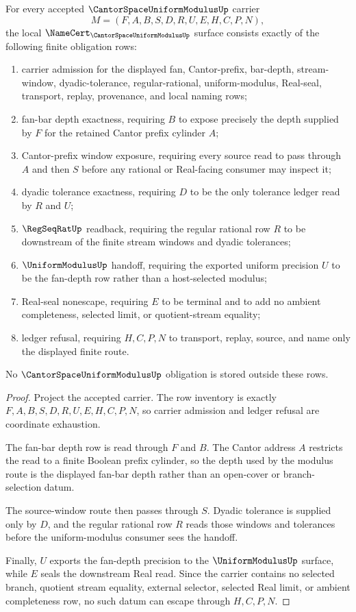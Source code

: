 \begin{theorem}
\label{thm:cantor-space-uniform-modulus-namecert-obligations}
For every accepted $\CantorSpaceUniformModulusUp$ carrier
$$
M=(F,A,B,S,D,R,U,E,H,C,P,N),
$$
the local $\NameCert_{\CantorSpaceUniformModulusUp}$ surface consists exactly of the following finite obligation rows:
\begin{enumerate}
\item carrier admission for the displayed fan, Cantor-prefix, bar-depth, stream-window, dyadic-tolerance, regular-rational, uniform-modulus, Real-seal, transport, replay, provenance, and local naming rows;
\item fan-bar depth exactness, requiring $B$ to expose precisely the depth supplied by $F$ for the retained Cantor prefix cylinder $A$;
\item Cantor-prefix window exposure, requiring every source read to pass through $A$ and then $S$ before any rational or Real-facing consumer may inspect it;
\item dyadic tolerance exactness, requiring $D$ to be the only tolerance ledger read by $R$ and $U$;
\item $\RegSeqRatUp$ readback, requiring the regular rational row $R$ to be downstream of the finite stream windows and dyadic tolerances;
\item $\UniformModulusUp$ handoff, requiring the exported uniform precision $U$ to be the fan-depth row rather than a host-selected modulus;
\item Real-seal nonescape, requiring $E$ to be terminal and to add no ambient completeness, selected limit, or quotient-stream equality;
\item ledger refusal, requiring $H,C,P,N$ to transport, replay, source, and name only the displayed finite route.
\end{enumerate}
No $\CantorSpaceUniformModulusUp$ obligation is stored outside these rows.
\end{theorem}
\begin{proof}
Project the accepted carrier. The row inventory is exactly $F,A,B,S,D,R,U,E,H,C,P,N$, so carrier admission and ledger refusal are coordinate exhaustion.

The fan-bar depth row is read through $F$ and $B$. The Cantor address $A$ restricts the read to a finite Boolean prefix cylinder, so the depth used by the modulus route is the displayed fan-bar depth rather than an open-cover or branch-selection datum.

The source-window route then passes through $S$. Dyadic tolerance is supplied only by $D$, and the regular rational row $R$ reads those windows and tolerances before the uniform-modulus consumer sees the handoff.

Finally, $U$ exports the fan-depth precision to the $\UniformModulusUp$ surface, while $E$ seals the downstream Real read. Since the carrier contains no selected branch, quotient stream equality, external selector, selected Real limit, or ambient completeness row, no such datum can escape through $H,C,P,N$.
\end{proof}

